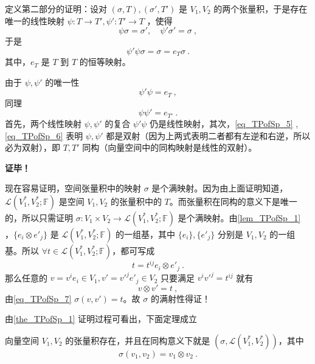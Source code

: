 定义第二部分的证明：设对 $(\sigma,T),(\sigma', T')$ 是 $V_1,V_2$ 的两个张量积，于是存在唯一的线性映射 $\psi:T\rightarrow T',\psi':T'\rightarrow T$ ，使得
\begin{equation}
\psi\sigma=\sigma',\quad\psi'\sigma'=\sigma~,
\end{equation}
于是
\begin{equation}
\psi'\psi\sigma=\sigma=e_T\sigma~.
\end{equation}
其中，$e_T$ 是 $T$ 到 $T$ 的恒等映射。

由于 $\psi,\psi'$ 的唯一性
\begin{equation}\label{eq_TPofSp_5}
\psi'\psi=e_T~,
\end{equation}
同理
\begin{equation}\label{eq_TPofSp_6}
\psi\psi'=e_{T'}~.
\end{equation}
首先，两个线性映射 $\psi,\psi'$ 的复合 $\psi'\psi$ 仍是线性映射，其次，\autoref{eq_TPofSp_5} ,\autoref{eq_TPofSp_6} 表明 $\psi,\psi'$ 都是双射（因为上两式表明二者都有左逆和右逆，所以必为双射），即 $T,T'$ 同构（向量空间中的同构映射是线性的双射）。

\textbf{证毕！}

现在容易证明，空间张量积中的映射 $\sigma$ 是个满映射。因为由上面证明知道，$\mathcal L(V^*_1,V^*_2;\mathbb F)$ 是空间 $V_1,V_2$ 的张量积中的 $T$。而张量积在同构的意义下是唯一的，所以只需证明 $\sigma:V_1\times V_2\rightarrow \mathcal L(V^*_1,V^*_2;\mathbb F)$ 是个满映射。由\autoref{lem_TPofSp_1} ，$\{e_i\otimes e'_j\}$ 是 $\mathcal L(V^*_1,V^*_2;\mathbb F)$ 的一组基，其中 $\{e_i\},\{e'_j\}$ 分别是 $V_1,V_2$ 的一组基。所以 $\forall t\in \mathcal L(V^*_1,V^*_2;\mathbb F)$，都可写成
\begin{equation}
t=t^{ij}e_i\otimes e'_j~.
\end{equation}
那么任意的 $v=v^i e_i\in V_1,v'=v'^j e'_j\in V_2$ 只要满足 $v^iv'^j=t^{ij}$ 就有
\begin{equation}
v\otimes v'=t~,
\end{equation}
由\autoref{eq_TPofSp_7} $\sigma(v,v')=t$。故 $\sigma$ 的满射性得证！

由\autoref{the_TPofSp_1} 证明过程可看出，下面定理成立
\begin{theorem}{}
向量空间 $V_1,V_2$ 的张量积存在，并且在同构意义下就是 $(\sigma,\mathcal L(V^*_1,V^*_2))$，其中
\begin{equation}
\sigma(v_1,v_2)=v_1\otimes v_2~.
\end{equation}
\end{theorem}
 
